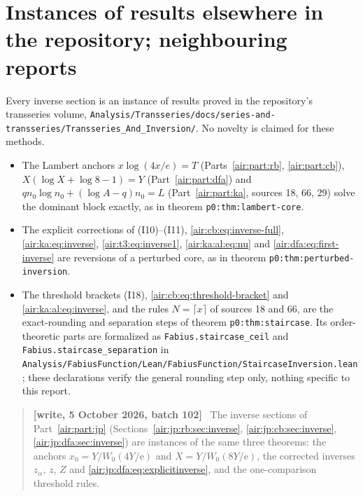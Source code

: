 \documentclass[11pt,letterpaper]{article}
\numberwithin{equation}{section}
\theoremstyle{remark}
\newcommand{\ee}{\mathrm e}
\newenvironment{writenotejp}{\par\smallskip\begin{quote}\small\textbf{[write, 5 October 2026, batch 102]}\ }{\end{quote}\smallskip}
\newcommand{\repopath}[1]{\nolinkurl{#1}}
\begin{document}
\section*{Instances of results elsewhere in the repository; neighbouring reports}
\label{air:guide:repository}
Every inverse section is an instance of results proved in the repository's transseries volume, \repopath{Analysis/Transseries/docs/series-and-transseries/Transseries_And_Inversion/}. No novelty is claimed for these methods.
\begin{itemize}
\item The Lambert anchors $x\log(4x/e)=T$ (Parts~\ref{air:part:rb}, \ref{air:part:cb}), $X(\log X+\log8-1)=Y$ (Part~\ref{air:part:dfa}) and $qn_0\log n_0+(\log A-q)n_0=L$ (Part~\ref{air:part:ka}, sources 18, 66, 29) solve the dominant block exactly, as in theorem \repopath{p0:thm:lambert-core}.
\item The explicit corrections of (I10)--(I11), \eqref{air:cb:eq:inverse-full}, \eqref{air:ka:eq:inverse}, \eqref{air:t3:eq:inverse1}, \eqref{air:ka:al:eq:nu} and \eqref{air:dfa:eq:first-inverse} are reversions of a perturbed core, as in theorem \repopath{p0:thm:perturbed-inversion}.
\item The threshold brackets (I18), \eqref{air:cb:eq:threshold-bracket} and \eqref{air:ka:al:eq:inverse}, and the rules $N=\lceil x\rceil$ of sources 18 and 66, are the exact-rounding and separation steps of theorem \repopath{p0:thm:staircase}. Its order-theoretic parts are formalized as \repopath{Fabius.staircase_ceil} and \repopath{Fabius.staircase_separation} in \repopath{Analysis/FabiusFunction/Lean/FabiusFunction/StaircaseInversion.lean}; these declarations verify the general rounding step only, nothing specific to this report.
\end{itemize}
\begin{writenotejp}
The inverse sections of Part~\ref{air:part:jp} (Sections~\ref{air:jp:rb:sec:inverse}, \ref{air:jp:cb:sec:inverse}, \ref{air:jp:dfa:sec:inverse}) are instances of the same three theorems: the anchors $x_0=Y/W_0(4Y/\ee)$ and $X=Y/W_0(8Y/\ee)$, the corrected inverses $z_\alpha$, $z$, $Z$ and \eqref{air:jp:dfa:eq:explicitinverse}, and the one-comparison threshold rules.
\end{writenotejp}
\end{document}
